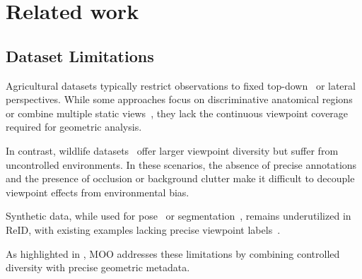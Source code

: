 \section{Related work}
\label{sec:related_work}

\subsection{Dataset Limitations}

Agricultural datasets typically restrict observations to fixed top-down~\cite{andrewVisualIdentificationIndividual2021a, gaoSelfSupervisionVideoIdentification2021b, xiaoCowIdentificationFreestall2022b, yuMultiCamCows2024MultiviewImage2024} or lateral~\cite{zhaoCompactLossVisual2022, liIndividualDairyCow2021} perspectives.
While some approaches focus on discriminative anatomical regions~\cite{adamSeaTurtleID2022LongspanDataset2024a, shojaeipourAutomatedMuzzleDetection2021, moskvyakLearningLandmarkGuided2020} or combine multiple static views~\cite{bergaminiMultiviewsEmbeddingCattle2018a, li2024cattle}, they lack the continuous viewpoint coverage required for geometric analysis.

In contrast, wildlife datasets~\cite{liATRWBenchmarkAmur2020, parham2017animal, atanbori2024spots, nepovinnykhSealIDSaimaaRinged2022a, dlaminiAutomatedIdentificationIndividuals2020b} offer larger viewpoint diversity but suffer from uncontrolled environments.
In these scenarios, the absence of precise annotations and the presence of occlusion or background clutter make it difficult to decouple viewpoint effects from environmental bias.

Synthetic data, while used for pose~\cite{Jiang2022BMVC, bonettoZebraPoseZebraDetection2024} or segmentation~\cite{muLearningSyntheticAnimals2020a, pengLearningPartSegmentation2024}, remains underutilized in ReID, with existing examples lacking precise viewpoint labels~\cite{picekCzechLynxDatasetIndividual2025}.

As highlighted in , MOO addresses these limitations by combining controlled diversity with precise geometric metadata.

